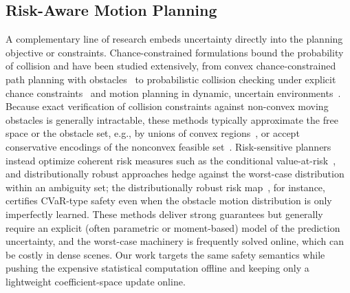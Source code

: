 \documentclass[lettersize,journal]{IEEEtran}
\begin{document}
\subsection{Risk-Aware Motion Planning}
A complementary line of research embeds uncertainty directly into the planning objective or constraints. Chance-constrained formulations bound the probability of collision and have been studied extensively, from convex chance-constrained path planning with obstacles~\cite{blackmore2011chance} to probabilistic collision checking under explicit chance constraints~\cite{} and motion planning in dynamic, uncertain environments~\cite{du2011robot}. Because exact verification of collision constraints against non-convex moving obstacles is generally intractable, these methods typically approximate the free space or the obstacle set, e.g., by unions of convex regions~\cite{zhang2020optimization,deits2015computing}, or accept conservative encodings of the nonconvex feasible set~\cite{da2019collision}. Risk-sensitive planners instead optimize coherent risk measures such as the conditional value-at-risk~\cite{hakobyan2019risk,fan2021step}, and distributionally robust approaches hedge against the worst-case distribution within an ambiguity set; the distributionally robust risk map~\cite{hakobyan2022distributionally}, for instance, certifies CVaR-type safety even when the obstacle motion distribution is only imperfectly learned. These methods deliver strong guarantees but generally require an explicit (often parametric or moment-based) model of the prediction uncertainty, and the worst-case machinery is frequently solved online, which can be costly in dense scenes. Our work targets the same safety semantics while pushing the expensive statistical computation offline and keeping only a lightweight coefficient-space update online.
\end{document}
